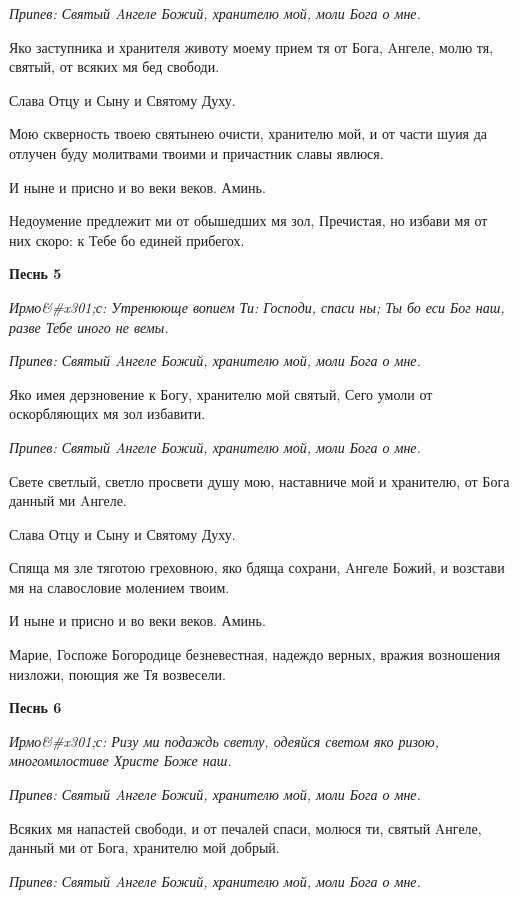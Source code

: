 \itshape Припев:\normalfont{} Святый Aнгеле Божий, хранителю мой, моли Бога о мне.


Яко заступника и хранителя животу моему прием тя от Бога, Aнгеле, молю тя, святый, от всяких мя бед свободи.


Слава Отцу и Сыну и Святому Духу.


Мою скверность твоею святынею очисти, хранителю мой, и от части шуия да отлучен буду молитвами твоими и причастник славы явлюся.


И ныне и присно и во веки веков. Аминь.


Недоумение предлежит ми от обышедших мя зол, Пречистая, но избави мя от них скоро: к Тебе бо единей прибегох.




\bfseries Песнь 5\normalfont{}


\itshape Ирмо&#x301;с:\normalfont{} Утренююще вопием Ти: Господи, спаси ны; Ты бо еси Бог наш, разве Тебе иного не вемы.


\itshape Припев:\normalfont{} Святый Aнгеле Божий, хранителю мой, моли Бога о мне.


Яко имея дерзновение к Богу, хранителю мой святый, Сего умоли от оскорбляющих мя зол избавити.


\itshape Припев:\normalfont{} Святый Aнгеле Божий, хранителю мой, моли Бога о мне.


Свете светлый, светло просвети душу мою, наставниче мой и хранителю, от Бога данный ми Aнгеле.


Слава Отцу и Сыну и Святому Духу.


Спяща мя зле тяготою греховною, яко бдяща сохрани, Aнгеле Божий, и возстави мя на славословие молением твоим.


И ныне и присно и во веки веков. Аминь.


Марие, Госпоже Богородице безневестная, надеждо верных, вражия возношения низложи, поющия же Тя возвесели.




\bfseries Песнь 6\normalfont{}


\itshape Ирмо&#x301;с:\normalfont{} Ризу ми подаждь светлу, одеяйся светом яко ризою, многомилостиве Христе Боже наш.


\itshape Припев:\normalfont{} Святый Aнгеле Божий, хранителю мой, моли Бога о мне.


Всяких мя напастей свободи, и от печалей спаси, молюся ти, святый Aнгеле, данный ми от Бога, хранителю мой добрый.


\itshape Припев:\normalfont{} Святый Aнгеле Божий, хранителю мой, моли Бога о мне.


